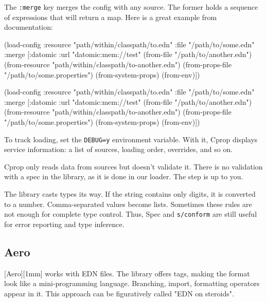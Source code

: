 The \verb|:merge| key merges the config with any source. The former holds a sequence of expressions that will return a map. Here is a great example from documentation:

\ifx\DEVICETYPE\MOBILE

\begin{clojure}
(load-config
 :resource "path/within/classpath/to.edn"
 :file "/path/to/some.edn"
 :merge
 [{:datomic {:url "datomic:mem://test"}}
  (from-file "/path/to/another.edn")
  (from-resource
  "path/within/classpath/to-another.edn")
  (from-props-file
   "/path/to/some.properties")
  (from-system-props)
  (from-env)])
\end{clojure}

\else

\begin{clojure}
(load-config
 :resource "path/within/classpath/to.edn"
 :file "/path/to/some.edn"
 :merge [{:datomic {:url "datomic:mem://test"}}
         (from-file "/path/to/another.edn")
         (from-resource "path/within/classpath/to-another.edn")
         (from-props-file "/path/to/some.properties")
         (from-system-props)
         (from-env)])
\end{clojure}

\fi

To track loading, set the \verb|DEBUG=y| environment variable. With it, Cprop displays service information: a list of sources, loading order, overrides, and so on.

Cprop only reads data from sources but doesn't validate it. There is no validation with a spec in the library, as it is done in our loader. The step is up to you.

The library casts types its way. If the string contains only digits, it is converted to a number. Comma-separated values become lists. Sometimes these rules are not enough for complete type control. Thus, Spec and \verb|s/conform| are still useful for error reporting and type inference.

\subsection{Aero}


[Aero][1mm] works with EDN files. The library offers tags, making the format look like a mini-programming language. Branching, import, formatting operators appear in it. This approach can be figuratively called "EDN on steroids".

